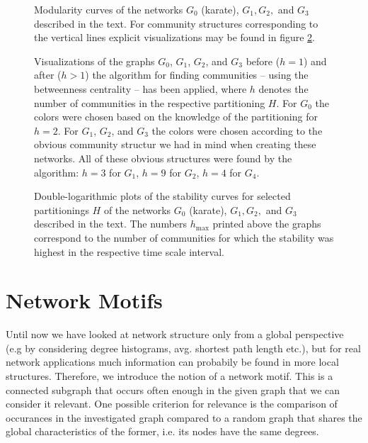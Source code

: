 \documentclass{scrartcl}
\begin{document}
\begin{figure}[bcht]
    \centering
    \caption{Modularity curves of the networks $G_0$ (karate), $G_1, G_2,$
        and $G_3$ described in the text. For community structures
        corresponding to the vertical lines explicit visualizations may be
        found in figure \ref{fig:12_gr}.}
    \label{fig:12_mod}
\end{figure}


\begin{figure}
    \centering
    \def\svgwidth{0.8\textwidth}
    
    \caption{Visualizations of the graphs $G_0$, $G_1$, $G_2$, and $G_3$
    before ($h = 1$) and after ($h > 1$) the algorithm for finding
    communities -- using the betweenness centrality -- has been applied,
    where $h$ denotes the number of communities in the respective
    partitioning $H$. For $G_0$ the colors were chosen based on the
    knowledge of the partitioning for $h=2$.  For $G_1$, $G_2$, and $G_3$
    the colors were chosen according to the obvious community
    structur we had in mind when creating these networks. All of these
    obvious structures were found by the algorithm: $h = 3$ for $G_1$,
    $h=9$ for $G_2$, $h=4$ for $G_4$.}
    \label{fig:12_gr}
\end{figure}


\begin{figure}
    \centering
    \caption{Double-logarithmic plots of the stability curves for selected
    partitionings $H$ of the networks $G_0$ (karate), $G_1, G_2,$ and
    $G_3$ described in the text. The numbers $h_\mathrm{max}$ printed above
    the graphs correspond to the number of communities for which the
    stability was highest in the respective time scale interval.}
    \label{fig:13}
\end{figure}

\section{Network Motifs}
Until now we have looked at network structure only from a global perspective (e.g by considering degree histograms, avg. shortest path length etc.), but for real network applications much information can probabily be found in more local structures. Therefore, we introduce the notion of a network motif. This is a connected subgraph that occurs often enough in the given graph that we can consider it relevant. One possible criterion for relevance is the comparison of occurances in the investigated graph compared to a random graph that shares the global characteristics of the former, i.e. its nodes have the same degrees.
\end{document}
